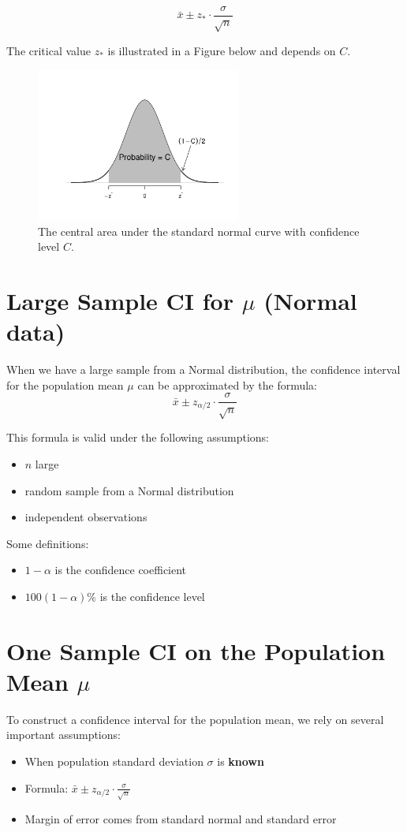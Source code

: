 \[
\bar{x} \pm z_{\ast} \cdot \frac{\sigma}{\sqrt{n}}
\]

The critical value $z_{\ast}$ is illustrated in a Figure below and depends on $C$.

\begin{figure}[H]
  \centering
  \includegraphics[width=0.6\textwidth]{Section6/images/normal_confidence_curve.pdf}
\vspace{-0.7em} %
\captionsetup{skip=0pt} %
 \caption{The central area under the standard normal curve with confidence level \( C \).}
\end{figure}

\section*{Large Sample CI for $\mu$ (Normal data)}
When we have a large sample from a Normal distribution, the confidence interval for the population mean \(\mu\) can be approximated by the formula:
\[
\bar{x} \pm z_{\alpha/2} \cdot \frac{\sigma}{\sqrt{n}}
\]

This formula is valid under the following assumptions:
\begin{itemize}
  \item $n$ large
  \item random sample from a Normal distribution
  \item independent observations
\end{itemize}

Some definitions:
\begin{itemize}
  \item $1 - \alpha$ is the confidence coefficient
  \item $100(1 - \alpha)\%$ is the confidence level
\end{itemize}


\section*{One Sample CI on the Population Mean $\mu$}
To construct a confidence interval for the population mean, we rely on several important assumptions:
\begin{itemize}
  \item When population standard deviation $\sigma$ is \textbf{known}
  \item Formula: $\bar{x} \pm z_{\alpha/2} \cdot \frac{\sigma}{\sqrt{n}}$
  \item Margin of error comes from standard normal and standard error
\end{itemize}

